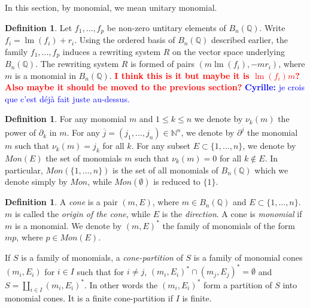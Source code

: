 \documentclass[10pt]{easychair}
\theoremstyle{definition}
\newtheorem{definition}[theorem]{Definition}
\newtheorem{example}[theorem]{Example}
\newcommand\todo[1]{{\bf\textcolor{red}{#1}}}
\newcommand\fixmecc[1]{{\textcolor{blue}{{\bf Cyrille:} #1}}}
\DeclareMathOperator{\lm}{lm}
\newcommand\Q{\mathbb{Q}}
\newcommand\Weyl[1]{B_{#1}(\Q)}
\begin{document}
In this section, by monomial, we mean unitary monomial.



\begin{definition}
  Let $f_1,\ldots,f_p$ be non-zero untitary elements of $\Weyl n$.
  Write $f_i = \lm (f_i) + r_i$.
  Using the ordered basis of $\Weyl n$ described earlier,
  the family $f_1,\ldots,f_p$ induces a rewriting system $R$ on the vector
  space underlying $\Weyl n$.
  The rewriting system $R$ is formed of pairs $(m \lm(f_i), - m  r_i)$,
  where $m$ is a monomial in $\Weyl n$.
  \todo{I think this is it but maybe it is $\lm(f_i) m$?
    Also maybe it should be moved to the previous section?}
  \fixmecc{je crois que c'est déjà fait juste au-dessus.}
\end{definition}

\begin{definition}
  For any monomial $m$ and $1 \leq k \leq n$ we denote by $\nu_k(m)$
  the power of $\partial_k$ in $m$.
  For any $\overline j =(j_1,\ldots,j_n) \in \mathbb N^n$, we denote by $\partial^{\overline j}$
  the monomial $m$ such that $\nu_k(m) = j_k$ for all $k$. For any subset
  $E \subset \{1,\ldots,n\}$, we denote by $Mon(E)$ the set of monomials $m$ such that
  $\nu_k(m) = 0$ for all $k \notin E$. In particular, $Mon(\{1,\ldots,n\})$ is the set of
  all monomials of $\Weyl n$ which we denote simply by $Mon$, while $Mon(\emptyset)$ is
  reduced to $\{1\}$. 
\end{definition}

\begin{definition}
  A \emph{cone} is a pair $(m,E)$, where $m \in \Weyl n$ and $E \subset \{1,\ldots,n\}$.
  $m$ is called the \emph{origin of the cone}, while $E$
  is the \emph{direction}. A cone is \emph{monomial} if $m$ is a monomial.
  We denote by $(m,E)^*$ the family of monomials of the form $mp$,
  where $p \in Mon(E)$.

  If $S$ is a family of monomials, a \emph{cone-partition} of $S$ is a family
  of monomial cones $(m_i,E_i)$ for $i \in I$ such that for $i \neq j$,
  $(m_i,E_i)^* \cap (m_j,E_j)^* = \emptyset$ and $S = \coprod_{i \in I} (m_i,E_i)^*$.
  In other words the $(m_i,E_i)^*$ form a partition of $S$ into monomial cones.
  It is a finite cone-partition if $I$ is finite.
\end{definition}
\end{document}
